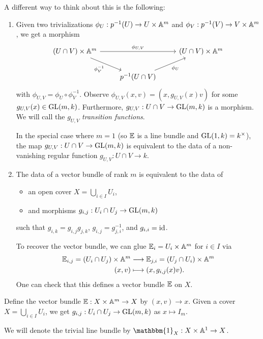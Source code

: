 \begin{remark}
  A different way to think about
  this is the following:
  \begin{enumerate}
    \item Given two trivializations
      $\phi_U : p^{-1}(U) \to U \times \mathbb{A}^m$
      and $\phi_V : p^{-1}(V) \to V \times \mathbb{A}^m$,
      we get a morphism
      \[
        \begin{tikzcd}
        (U \cap V) \times \Affine^m
        \ar[rr, "\phi_{U, V}"]
        \ar[dr, "\phi_V^{-1}", swap]
        & & (U \cap V) \times \Affine^m \\
        & p^{-1}(U \cap V) \ar[ur, "\phi_U", swap]
        \end{tikzcd}
      \]
      with $\phi_{U, V} = \phi_U \circ \phi_V^{-1}$.
      Observe
      $\phi_{U, V}(x, v) = (x, g_{U, V}(x) v)$
      for some
      $g_{U, V}(x) \in \operatorname{GL}(m, k)$.
      Furthermore,
      $g_{U, V} : U \cap V \to \operatorname{GL}(m, k)$
      is a morphism.
      We will call the
      $g_{U, V}$ \emph{transition functions}.

      In the special case where
      $m = 1$ (so
      $\mathbb{E}$ is a line bundle
      and $\operatorname{GL}(1, k) = k^\times$),
      the map
      $g_{U, V} : U \cap V\to \operatorname{GL}(m, k)$
      is equivalent to the data of a
      non-vanishing regular function
      $g_{U, V} : U \cap V \to k$.
    \item The data of a vector bundle
      of rank $m$
      is equivalent to the data of
      \begin{itemize}
        \item an open cover
          $X = \bigcup_{i \in I} U_i$,
        \item and morphisms
          $g_{i, j} : U_i \cap U_j \to \operatorname{GL}(m, k)$
      \end{itemize}
      such that
      $g_{i, k} = g_{i, j} g_{j, k}$,
      $g_{i, j} = g_{j, i}^{-1}$,
      and $g_{i, i} = \operatorname{id}$.

      To recover the vector bundle,
      we can glue
      $\mathbb{E}_i = U_i \times \mathbb{A}^m$
      for $i \in I$
      via
      \begin{align*}
        \mathbb{E}_{i, j}
        = (U_i \cap U_j) \times \mathbb{A}^m
        &\longrightarrow
        \mathbb{E}_{j, i}
        = (U_j \cap U_i) \times \mathbb{A}^m \\
        (x, v) &\longmapsto
        (x, g_{i, j}(x) v).
      \end{align*}
      One can check that this defines
      a vector bundle $\mathbb{E}$ on $X$.
  \end{enumerate}
\end{remark}

\begin{example}
  Define the vector bundle
  $\mathbb{E} : X \times \mathbb{A}^m \to X$
  by $(x, v) \to x$.
  Given a cover $X = \bigcup_{i \in I} U_i$,
  we get $g_{i, j} : U_i \cap U_j \to \operatorname{GL}(m, k)$
  as $x \mapsto I_m$.
\end{example}

\begin{example}
  We will denote the trivial
  line bundle by
  $\mathbbm{1}_X : X \times \Affine^1 \to X$.
\end{example}
